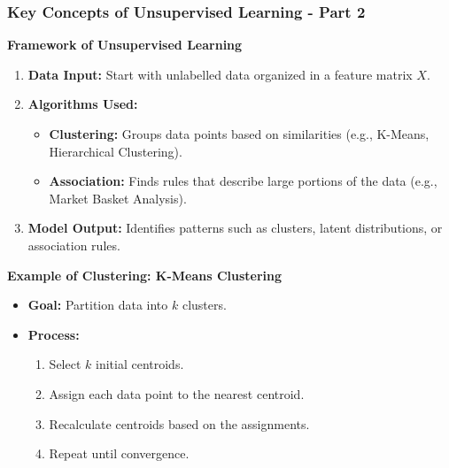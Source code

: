 \documentclass[aspectratio=169]{beamer}
\begin{document}
\begin{frame}[fragile]
    \frametitle{Key Concepts of Unsupervised Learning - Part 2}
    
    \textbf{Framework of Unsupervised Learning}
    \begin{enumerate}
        \item \textbf{Data Input:} Start with unlabelled data organized in a feature matrix \(X\).
        
        \item \textbf{Algorithms Used:}
        \begin{itemize}
            \item \textbf{Clustering:} Groups data points based on similarities (e.g., K-Means, Hierarchical Clustering).
            \item \textbf{Association:} Finds rules that describe large portions of the data (e.g., Market Basket Analysis).
        \end{itemize}
        
        \item \textbf{Model Output:} Identifies patterns such as clusters, latent distributions, or association rules.
    \end{enumerate}
    
    \textbf{Example of Clustering: K-Means Clustering}
    \begin{itemize}
        \item \textbf{Goal:} Partition data into \(k\) clusters.
        \item \textbf{Process:}
            \begin{enumerate}
                \item Select \(k\) initial centroids.
                \item Assign each data point to the nearest centroid.
                \item Recalculate centroids based on the assignments.
                \item Repeat until convergence.
            \end{enumerate}
    \end{itemize} 
    
\end{frame}
\end{document}
